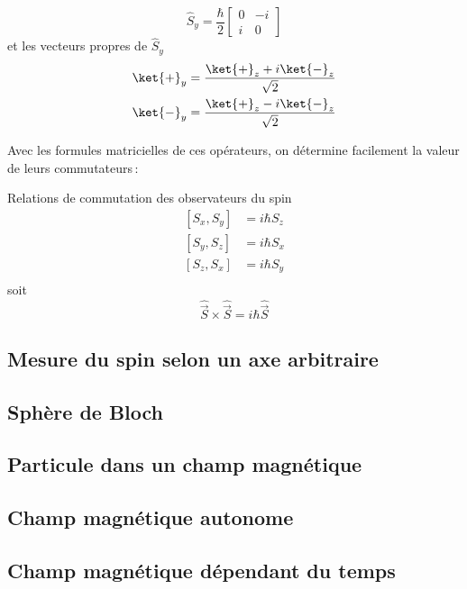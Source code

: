          \[ \hat{S}_y = \frac{\hbar}{2} \begin{bmatrix}
            0 & -i \\
            i & 0
        \end{bmatrix} \]
        et les vecteurs propres de $\hat{S}_y$ 
        \begin{align*}
            \ket{+}_y &= \frac{\ket{+}_z + i \ket{-}_z}{\sqrt{2}} \\
            \ket{-}_y &= \frac{\ket{+}_z - i \ket{-}_z}{\sqrt{2}} \\
        \end{align*}

        Avec les formules matricielles de ces opérateurs, on détermine facilement la valeur de leurs commutateurs :

        \begin{omed}{Relations de commutation des observateurs du spin}
            \begin{align*}
                \left[S_x, S_y\right] &= i\hbar S_z \\
                \left[S_y, S_z\right] &= i\hbar S_x \\
                \left[S_z, S_x\right] &= i\hbar S_y \\
            \end{align*}
            soit 
            \[ \hat{\vec{S}} \times \hat{\vec{S}} = i \hbar \hat{\vec{S}} \]
        \end{omed}

    \subsection{Mesure du spin selon un axe arbitraire}



        \subsection{Sphère de Bloch}

    \subsection{Particule dans un champ magnétique}

        \subsection{Champ magnétique autonome}

        \subsection{Champ magnétique dépendant du temps}

        